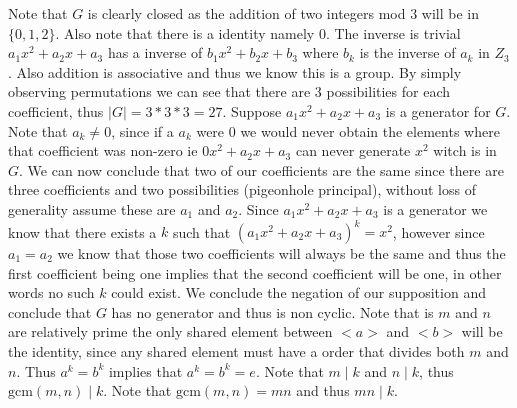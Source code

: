 \documentclass[12pt]{article}
\makeatletter
\theoremstyle{homework}
\newenvironment{exercise}[1]
{\def\@currentlabel{#1}\exercisecore}
{\endexercisecore}
\makeatother
\begin{document}
\begin{exercise}
{4.82}
Note that $G$ is clearly closed as the addition of two integers mod 3 will be in $\{0,1,2\}$.  Also note that there is a identity namely $0$.  The inverse is trivial $a_1x^2+a_2x+a_3$ has a inverse of $b_1x^2+b_2x+b_3$ where $b_k$ is the inverse of $a_k$ in $Z_3$.  Also addition is associative and thus we know this is a group.  By simply observing permutations we can see that there are $3$ possibilities for each coefficient, thus $|G|=3*3*3=27$.  Suppose $a_1x^2+a_2x+a_3$ is a generator for $G$.  Note that $a_k\neq 0$, since if a $a_k$ were $0$ we would never obtain the elements where that coefficient was non-zero ie $0x^2+a_2x+a_3$ can never generate $x^2$ witch is in $G$.  We can now conclude that two of our coefficients are the same since there are three coefficients and two possibilities (pigeonhole principal), without loss of generality assume these are $a_1$ and $a_2$.  Since $a_1x^2+a_2x+a_3$ is a generator we know that there exists a $k$ such that $(a_1x^2+a_2x+a_3)^k=x^2$, however since $a_1=a_2$ we know that those two coefficients will always be the same and thus the first coefficient being one implies that the second coefficient will be one, in other words no such $k$ could exist.  We conclude the negation of our supposition and conclude that $G$ has no generator and thus is non cyclic.
\end{exercise}
\begin{exercise}
{4.83}
Note that is $m$ and $n$ are relatively prime the only shared element between $<a>$ and $<b>$ will be the identity, since any shared element must have a order that divides both $m$ and $n$.  Thus $a^k=b^k$ implies that $a^k=b^k=e$.  Note that $m\mid k$ and $n\mid k$, thus $\text{gcm}(m,n)\mid k$.  Note that $\text{gcm}(m,n)=mn$ and thus $mn\mid k$.
\end{exercise}
\end{document}
